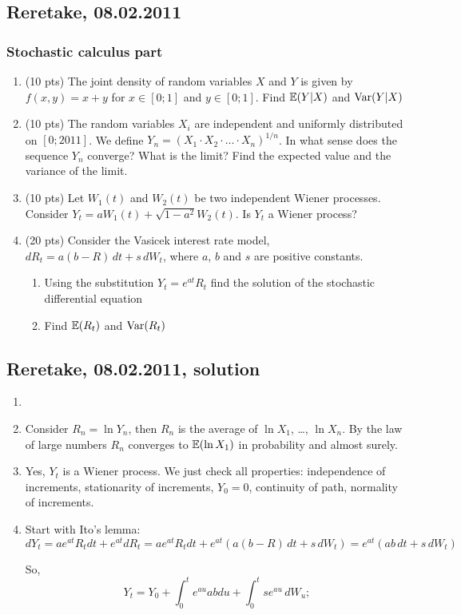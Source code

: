 \documentclass[12pt, a4paper]{article}
\begin{document}
\subsection{Reretake, 08.02.2011}

\subsubsection*{Stochastic calculus part}

\begin{enumerate}

\item (10 pts) The joint density of random variables $X$ and $Y$ is given by $f(x,y)=x+y$ for $x\in [0;1]$ and $y\in[0;1]$. Find $\mathbb{E}(Y|X)$ and $\operatorname{Var}(Y|X)$
\item (10 pts) The random variables $X_i$ are independent and uniformly distributed on $[0;2011]$. We define $Y_n=(X_1\cdot X_2\cdot \ldots \cdot X_n)^{1/n}$. In what sense does the sequence $Y_n$ converge? What is the limit? Find the expected value and the variance of the limit.
\item (10 pts) Let $W_1(t)$ and $W_2(t)$ be two independent Wiener processes. Consider $Y_t=aW_1(t)+\sqrt{1-a^2}W_2 (t)$. Is $Y_t$ a Wiener process?
\item (20 pts) Consider the Vasicek interest rate model, $dR_t=a(b-R) \, dt+s \, dW_t$, where $a$, $b$ and $s$ are positive constants.
\begin{enumerate}
\item Using the substitution $Y_t=e^{at} R_t$ find the solution of the stochastic differential equation
\item Find $\mathbb{E}(R_t)$ and $\operatorname{Var}(R_t)$
\end{enumerate}


\end{enumerate}

\subsection{Reretake, 08.02.2011, solution}

\begin{enumerate}
\item
\item Consider $R_n = \ln Y_n$, then $R_n$ is the average of $\ln X_1$, \ldots, $\ln X_n$. By the law of large numbers $R_n$ converges to $\mathbb{E}(\ln X_1)$ in probability and almost surely.
\item Yes, $Y_t$ is a Wiener process. We just check all properties: independence of increments, stationarity of increments, $Y_0=0$, continuity of path, normality of increments.
\item Start with Ito's lemma:
\[
dY_t = a e^{at} R_t dt + e^{at} dR_t =
a e^{at} R_t dt + e^{at} (a(b-R) \, dt+s \, dW_t) =
 e^{at} (ab \, dt+s \, dW_t)
\]

So,
\[
Y_t = Y_0 + \int_0^t e^{au}ab du + \int_0^t se^{au}\,dW_u;
\]

\end{enumerate}
\end{document}
